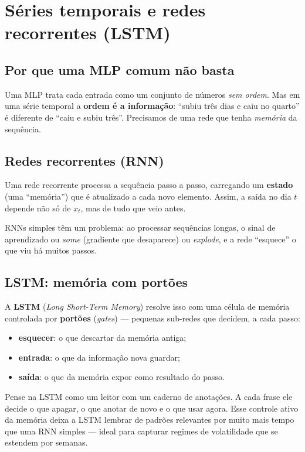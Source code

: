 \section{Séries temporais e redes recorrentes (LSTM)}
\label{sec:lstm}

\subsection{Por que uma MLP comum não basta}
Uma MLP trata cada entrada como um conjunto de números \emph{sem ordem}. Mas em
uma série temporal a \textbf{ordem é a informação}: ``subiu três dias e caiu no
quarto'' é diferente de ``caiu e subiu três''. Precisamos de uma rede que tenha
\emph{memória} da sequência.

\subsection{Redes recorrentes (RNN)}
\begin{definicao}[RNN]
Uma rede recorrente processa a sequência passo a passo, carregando um
\textbf{estado} (uma ``memória'') que é atualizado a cada novo elemento. Assim, a
saída no dia $t$ depende não só de $x_t$, mas de tudo que veio antes.
\end{definicao}

RNNs simples têm um problema: ao processar sequências longas, o sinal de
aprendizado ou \emph{some} (gradiente que desaparece) ou \emph{explode}, e a rede
``esquece'' o que viu há muitos passos.

\subsection{LSTM: memória com portões}
A \textbf{LSTM} (\emph{Long Short-Term Memory}) resolve isso com uma célula de
memória controlada por \textbf{portões} (\emph{gates}) --- pequenas
sub-redes que decidem, a cada passo:
\begin{itemize}[noitemsep]
  \item \textbf{esquecer}: o que descartar da memória antiga;
  \item \textbf{entrada}: o que da informação nova guardar;
  \item \textbf{saída}: o que da memória expor como resultado do passo.
\end{itemize}

\begin{intuicao}
Pense na LSTM como um leitor com um caderno de anotações. A cada frase ele
decide o que apagar, o que anotar de novo e o que usar agora. Esse controle
ativo da memória deixa a LSTM lembrar de padrões relevantes por muito mais tempo
que uma RNN simples --- ideal para capturar regimes de volatilidade que se
estendem por semanas.
\end{intuicao}

